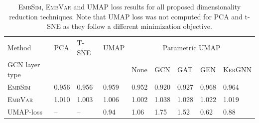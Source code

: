 \documentclass[]{article}
\begin{document}
\begin{table}
	\centering
	\renewcommand{\arraystretch}{1.2}
	
	\begin{tabular}{|l|l|l|l|l|l|l|l|l|}
		\hline
		Method&PCA&T-SNE&UMAP&\multicolumn{5}{c|}{Parametric UMAP}\\
		GCN layer type &&&&None&\textsc{GCN}&\textsc{GAT}&\textsc{GEN}&\textsc{KerGNN}\\
		\hline
		\textsc{EmbSim}&0.956&0.956&0.959&0.952&0.920&0.927&0.968&0.964\\
		
		\textsc{EmbVar}&1.010&1.003&1.006&1.002&1.038&1.028&1.022&1.019\\
		\hline
		UMAP-loss&--&--&0.94&1.06&1.75&1.52&0.62&0.88\\
		\hline
	\end{tabular}

	\caption[\textsc{EmbSim}, \textsc{EmbVar} and UMAP loss results for all proposed dimensionality reduction techniques]{\textsc{EmbSim}, \textsc{EmbVar} and UMAP loss results for all proposed dimensionality reduction techniques. Note that UMAP loss was not computed for PCA and t-SNE as they follow a different minimization objective.}
	\label{tab:dim_red_GCN}
\end{table}
\end{document}
